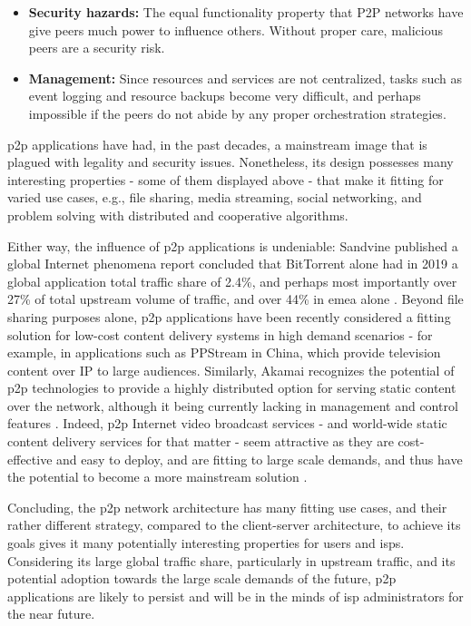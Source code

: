 \begin{itemize}
    \item \textbf{Security hazards:} The equal functionality property that \gls{P2P} networks have give peers much power to influence others.
        Without proper care, malicious peers are a security risk.
    \item \textbf{Management:} Since resources and services are not centralized, tasks such as event logging and resource backups become very difficult, and perhaps impossible if the peers do not abide by any proper orchestration strategies.
\end{itemize}

    \gls{p2p} applications have had, in the past decades, a mainstream image that is plagued with legality and security issues.
    Nonetheless, its design possesses many interesting properties - some of them displayed above - that make it fitting for varied use cases, e.g., file sharing, media streaming, social networking, and problem solving with distributed and cooperative algorithms.

    Either way, the influence of \gls{p2p} applications is undeniable: Sandvine \cite{sandvine} published a global Internet phenomena report concluded that BitTorrent \cite{bittorrent} alone had in 2019 a global application total traffic share of 2.4\%, and perhaps most importantly over 27\% of total upstream volume of traffic, and over 44\% in \gls{emea} alone \cite{sandvine2019}.
    Beyond file sharing purposes alone, \gls{p2p} applications have been recently considered a fitting solution for low-cost content delivery systems in high demand scenarios - for example, in applications such as PPStream \cite{ppstream} in China, which provide television content over IP to large audiences.
    Similarly, Akamai \cite{akamai} recognizes the potential of \gls{p2p} technologies to provide a highly distributed option for serving static content over the network, although it being currently lacking in management and control features \cite{akamai-report}.
    Indeed, \gls{p2p} Internet video broadcast services - and world-wide static content delivery services for that matter - seem attractive as they are cost-effective and easy to deploy, and are fitting to large scale demands, and thus have the potential to become a more mainstream solution \cite{jiangchuanliu2008}.

    Concluding, the \gls{p2p} network architecture has many fitting use cases, and their rather different strategy, compared to the client-server architecture, to achieve its goals gives it many potentially interesting properties for users and \glspl{isp}.
    Considering its large global traffic share, particularly in upstream traffic, and its potential adoption towards the large scale demands of the future, \gls{p2p} applications are likely to persist and will be in the minds of \gls{isp} administrators for the near future.

